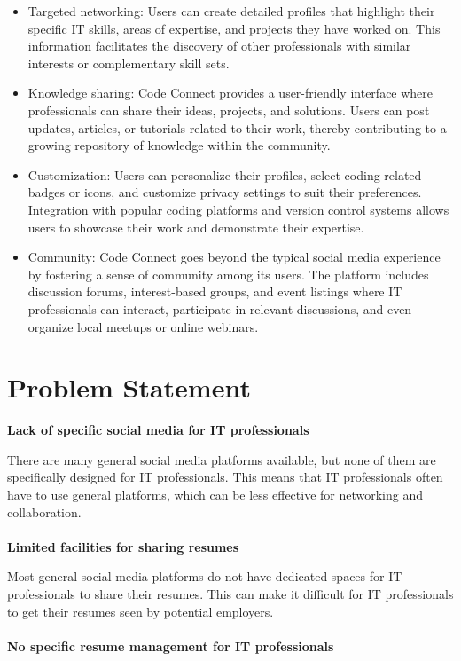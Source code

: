 \documentclass{article}
\begin{document}
\begin{itemize}
    \item Targeted networking: Users can create detailed profiles that highlight their specific IT skills, areas of expertise, and projects they have worked on. This information facilitates the discovery of other professionals with similar interests or complementary skill sets.
    \item Knowledge sharing: Code Connect provides a user-friendly interface where professionals can share their ideas, projects, and solutions. Users can post updates, articles, or tutorials related to their work, thereby contributing to a growing repository of knowledge within the community.
    \item Customization: Users can personalize their profiles, select coding-related badges or icons, and customize privacy settings to suit their preferences. Integration with popular coding platforms and version control systems allows users to showcase their work and demonstrate their expertise.
    \item Community: Code Connect goes beyond the typical social media experience by fostering a sense of community among its users. The platform includes discussion forums, interest-based groups, and event listings where IT professionals can interact, participate in relevant discussions, and even organize local meetups or online webinars.
\end{itemize}

\section{Problem Statement}
\textbf{Lack of specific social media for IT professionals}


There are many general social media platforms available, but none of them are specifically designed for IT professionals. This means that IT professionals often have to use general platforms, which can be less effective for networking and collaboration.\\\\
\textbf{Limited facilities for sharing resumes}


Most general social media platforms do not have dedicated spaces for IT professionals to share their resumes. This can make it difficult for IT professionals to get their resumes seen by potential employers.\\\\
\textbf{No specific resume management for IT professionals}
\end{document}
